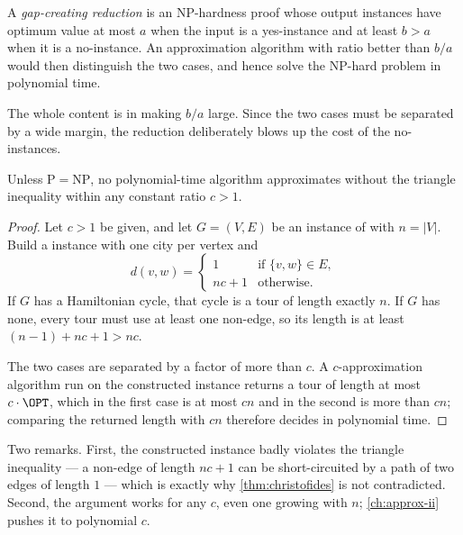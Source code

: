 \begin{definition}\label{def:gap-technique}
A \emph{gap-creating reduction} is an \textrm{NP}-hardness proof whose output
instances have optimum value at most $a$ when the input is a yes-instance and
at least $b > a$ when it is a no-instance. An approximation algorithm with
ratio better than $b/a$ would then distinguish the two cases, and hence solve
the \textrm{NP}-hard problem in polynomial time.
\end{definition}

The whole content is in making $b/a$ large. Since the two cases must be
separated by a wide margin, the reduction deliberately blows up the cost of the
no-instances.

\begin{theorem}\label{thm:tsp-no-approx}
Unless $\mathrm{P} = \mathrm{NP}$, no polynomial-time algorithm approximates
 without the triangle inequality within any constant ratio $c > 1$.
\end{theorem}

\begin{proof}
Let $c > 1$ be given, and let $G = (V,E)$ be an instance of
 with $n = |V|$. Build a  instance with one
city per vertex and
\[
  d(v,w) = \begin{cases}
    1 & \text{if } \{v,w\} \in E, \\
    nc + 1 & \text{otherwise.}
  \end{cases}
\]
If $G$ has a Hamiltonian cycle, that cycle is a tour of length exactly $n$. If
$G$ has none, every tour must use at least one non-edge, so its length is at
least $(n-1) + nc + 1 > nc$.

The two cases are separated by a factor of more than $c$. A $c$-approximation
algorithm run on the constructed instance returns a tour of length at most
$c \cdot \OPT$, which in the first case is at most $cn$ and in the second is
more than $cn$; comparing the returned length with $cn$ therefore decides
 in polynomial time.
\end{proof}

Two remarks. First, the constructed instance badly violates the triangle
inequality --- a non-edge of length $nc+1$ can be short-circuited by a path of
two edges of length $1$ --- which is exactly why \cref{thm:christofides} is not
contradicted. Second, the argument works for any $c$, even one growing with
$n$; \cref{ch:approx-ii} pushes it to polynomial $c$.

